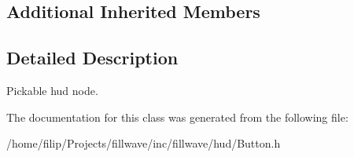 \subsection*{Additional Inherited Members}


\subsection{Detailed Description}
Pickable hud node. 

The documentation for this class was generated from the following file\+:\begin{DoxyCompactItemize}
\item 
/home/filip/\+Projects/fillwave/inc/fillwave/hud/Button.\+h\end{DoxyCompactItemize}
